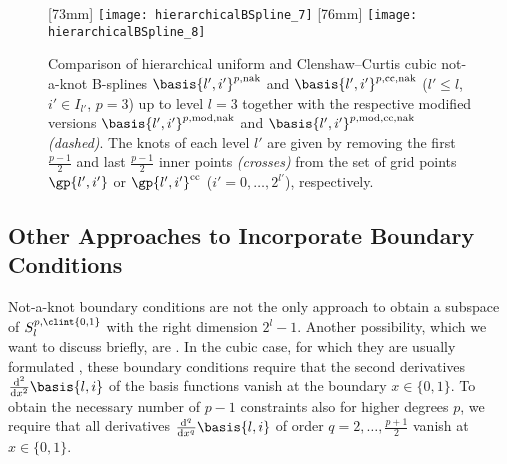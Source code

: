 \begin{figure}
  [73mm]{%
    \texttt{[image: hierarchicalBSpline\_7]}%
  }%
  \hfill
  [76mm]{%
    \texttt{[image: hierarchicalBSpline\_8]}%
  }%
  \caption{%
    Comparison of hierarchical uniform and Clenshaw--Curtis cubic not-a-knot
    B-splines $\basis{l',i'}^{p,\notaknot}$ and
    $\basis{l',i'}^{p,\clenshawcurtis,\notaknot}$
    ($l ' \le l$, $i' \in I_{l'}$, $p = 3$) up to level $l = 3$
    together with the respective modified versions
    $\basis{l',i'}^{p,\modified,\notaknot}$ and
    $\basis{l',i'}^{p,\modified,\clenshawcurtis,\notaknot}$
    \emph{(dashed)}.
    The knots of each level $l'$ are given by removing the
    first $\tfrac{p-1}{2}$ and last $\tfrac{p-1}{2}$
    inner points \emph{(crosses)}
    from the set of grid points $\gp{l',i'}$ or
    $\gp{l',i'}^\clenshawcurtis$
    ($i' = 0, \dotsc, 2^{l'}$), respectively.%
  }%
\end{figure}



\subsection{Other Approaches to Incorporate Boundary Conditions}
\label{sec:324naturalBoundary}

Not-a-knot boundary conditions are not the only approach
to obtain a subspace of $S_l^{p,\clint{0,1}}$ with the right dimension $2^l - 1$.
Another possibility, which we want to discuss briefly, are
.
In the cubic case, for which they are usually formulated
\cite{Hoellig13Approximation},
these boundary conditions require that the
second derivatives $\frac{\diff^2}{\dx^2} \basis{l,i}$ of the
basis functions vanish at the boundary $x \in \{0, 1\}$.
To obtain the necessary number of $p - 1$ constraints also
for higher degrees $p$,
we require that all derivatives
$\frac{\diff^q}{\dx^q} \basis{l,i}$ of order
$q = 2, \dotsc, \tfrac{p+1}{2}$ vanish at $x \in \{0, 1\}$.

